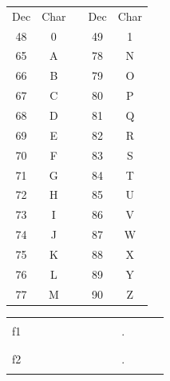 \documentclass[11pt,a4paper]{article}
\begin{document}
\begin{table}[ht!]
  \centering
  \begin{minipage}{0.3\textwidth}
    \centering

\begin{tabular}{ |c|c| m{0.3cm} |c|c| }
\cline{1-2} \cline{4-5}
Dec & Char &   & Dec & Char \\
\cline{1-2} \cline{4-5}
48 & 0 &  & 49 & 1 \\
\cline{1-2} \cline{4-5}
65 & A &  & 78 & N \\
66 & B &  & 79 & O \\
67 & C &  & 80 & P \\
68 & D &  & 81 & Q \\
69 & E &  & 82 & R \\
70 & F &  & 83 & S \\
71 & G &  & 84 & T \\
72 & H &  & 85 & U \\
73 & I &  & 86 & V \\
74 & J &  & 87 & W \\
75 & K &  & 88 & X \\
76 & L &  & 89 & Y \\
77 & M &  & 90 & Z \\
\cline{1-2} \cline{4-5}
\end{tabular}

  \end{minipage}
  \hfillx
  \begin{minipage}{0.65\textwidth}
    \centering

\begin{tabular}{ c   | m{0.45cm} | m{0.45cm} | m{0.45cm} | m{0.45cm} | m{0.45cm} | m{0.45cm} | m{0.45cm} | m{0.45cm} | c | m{0.45cm} | m{0.45cm} | m{0.45cm} | }
\cline{2-9} \cline{11-13}
 & & & & & & & & &   & & & \\
f1   & & & & & & & & &  .  & & & \\
 & & & & & & & & &   & & & \\
\cline{2-9} \cline{11-13}
 & & & & & & & & &   & & & \\
f2   & & & & & & & & &  .  & & & \\
 & & & & & & & & &   & & & \\
\cline{2-9} \cline{11-13}
\end{tabular}

  \end{minipage}
\end{table}
\end{document}

